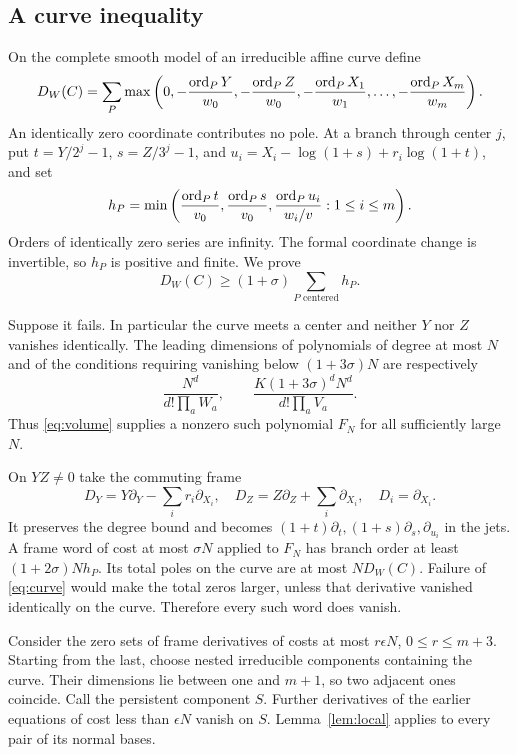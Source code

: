 \subsection{A curve inequality}

On the complete smooth model of an irreducible affine curve define
\[
 D_W(C)=\sum_P\max\left(0,-\frac{\operatorname{ord}_PY}{w_0},
        -\frac{\operatorname{ord}_PZ}{w_0},
        -\frac{\operatorname{ord}_PX_1}{w_1},\ldots,-\frac{\operatorname{ord}_PX_m}{w_m}\right).
\]
An identically zero coordinate contributes no pole. At a branch through
center \(j\), put \(t=Y/2^j-1\), \(s=Z/3^j-1\), and
\(u_i=X_i-\log(1+s)+r_i\log(1+t)\), and set
\[
 h_P=\min\left(\frac{\operatorname{ord}_Pt}{v_0},\frac{\operatorname{ord}_Ps}{v_0},
                         \frac{\operatorname{ord}_Pu_i}{w_i/v}:1\leq i\leq m\right).
\]
Orders of identically zero series are infinity. The formal coordinate
change is invertible, so \(h_P\) is positive and finite.
We prove
\begin{equation}\label{eq:curve}
                D_W(C)\geq(1+\sigma)\sum_{P\text{ centered}}h_P.
\end{equation}

Suppose it fails. In particular the curve meets a center and neither
\(Y\) nor \(Z\) vanishes identically. The leading dimensions of
polynomials of degree at most \(N\) and of the conditions requiring
vanishing below \((1+3\sigma)N\) are respectively
\[
 \frac{N^d}{d!\prod_a W_a},\qquad
 \frac{K(1+3\sigma)^dN^d}{d!\prod_a V_a}.
\]
Thus \eqref{eq:volume} supplies a nonzero such polynomial \(F_N\)
for all sufficiently large \(N\).

On \(YZ\ne0\) take the commuting frame
\[
 D_Y=Y\partial_Y-\sum_i r_i\partial_{X_i},\quad
 D_Z=Z\partial_Z+\sum_i\partial_{X_i},\quad D_i=\partial_{X_i}.
\]
It preserves the degree bound and becomes
\((1+t)\partial_t,(1+s)\partial_s,\partial_{u_i}\) in the jets.
A frame word of cost at most \(\sigma N\) applied to \(F_N\)
has branch order at least \((1+2\sigma)Nh_P\). Its total poles on
the curve are at most \(ND_W(C)\). Failure of \eqref{eq:curve}
would make the total zeros larger, unless that derivative vanished
identically on the curve. Therefore every such word does vanish.

Consider the zero sets of frame derivatives of costs at most
\(r\epsilon N\), \(0\leq r\leq m+3\). Starting from the last,
choose nested irreducible components containing the curve. Their
dimensions lie between one and \(m+1\), so two adjacent ones coincide.
Call the persistent component \(S\). Further derivatives of the earlier
equations of cost less than \(\epsilon N\) vanish on \(S\).
Lemma~\ref{lem:local} applies to every pair of its normal bases.

